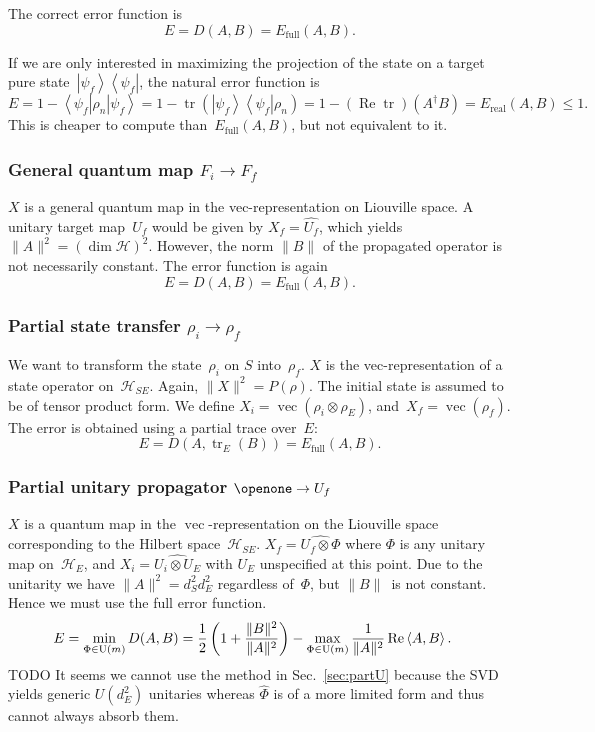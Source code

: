 \documentclass[aps, pra, a4paper, longbibliography, superscriptaddress]{revtex4-1}
\newcommand{\I}{\openone}
\newcommand{\be}{\begin{equation}}
\newcommand{\ee}{\end{equation}}
\newcommand{\ket}[1]{\left| #1 \right \rangle}
\newcommand{\bra}[1]{\left \langle #1 \right|}
\newcommand{\ketbra}[2]{\left| #1 \right \rangle \left \langle #2 \right|}
\newcommand{\inprod}[2]{\left\langle #1, #2 \right\rangle}
\newcommand{\hilb}[1]{\mathcal{#1}}
\DeclareMathOperator{\tr}{tr}
\DeclareMathOperator{\re}{Re}
\DeclareMathOperator{\cvec}{vec}
\newcommand{\vecop}[1]{\widehat{#1}}
\begin{document}
The correct error function is
\be
E
= D(A, B)
= E_\text{full}(A, B).
\ee

If we are only interested in maximizing the projection of
the state on a target pure state~$\ketbra{\psi_f}{\psi_f}$, the natural error
function is
\be
E
= 1 -\bra{\psi_f} \rho_n \ket{\psi_f}
= 1 -\tr\left(\ketbra{\psi_f}{\psi_f} \rho_n \right)
= 1 -(\re \tr)\left(A^\dagger B\right)
= E_\text{real}(A, B) \le 1.
\ee
This is cheaper to compute than~$E_\text{full}(A, B)$, but not equivalent to it.


\subsubsection{General quantum map $F_i \to F_f$}

$X$ is a general quantum map in the vec-representation on Liouville space.
A unitary target map~$U_f$ would be given by
$X_f = \vecop{U_f}$, which yields $\|A\|^2 = (\dim \hilb{H})^2$.
However, the norm $\|B\|$ of the propagated operator
is not necessarily constant. The error function is again
\be
E
= D(A, B)
= E_\text{full}(A, B).
\ee


\subsubsection{Partial state transfer $\rho_i \to \rho_f$}

We want to transform the state~$\rho_i$ on $S$ into~$\rho_f$.
$X$ is the vec-representation of a state operator on~$\hilb{H}_{SE}$.
Again, $\|X\|^2 = P(\rho)$.
The initial state is assumed to be of tensor product form.
We define $X_i = \cvec(\rho_i \otimes \rho_E)$,
and~$X_f = \cvec(\rho_f)$.
The error is obtained using a partial trace over~$E$:
\be
E
= D(A, \tr_E(B))
= E_\text{full}(A, B).
\ee


\subsubsection{Partial unitary propagator $\I \to U_f$}

$X$ is a quantum map in the $\cvec$-representation on the Liouville
space corresponding to the Hilbert space~$\hilb{H}_{SE}$.
$X_f = \vecop{U_f \otimes \Phi}$
where $\Phi$ is any unitary map on~$\hilb{H}_E$, and
$X_i = \vecop{U_i \otimes U_E}$ with $U_E$ unspecified at this point.
Due to the unitarity we have $\|A\|^2 = d_S^2 d_E^2$ regardless of~$\Phi$,
but $\|B\|$~is not constant. Hence we must use the full error function.
\begin{align}
\notag
E
&= \min_{\Phi \in \text{U}(m)} D(A, B)
= \frac{1}{2}\left(1 +\frac{\|B\|^2}{\|A\|^2}\right)
-\max_{\Phi \in \text{U}(m)} \frac{1}{\|A\|^2} \re \inprod{A}{B}.
\end{align}
TODO It seems we cannot use the method in Sec.~\ref{sec:partU}
because the SVD yields generic $U(d_E^2)$ unitaries whereas $\vecop{\Phi}$
is of a more limited form and thus cannot always absorb them.
\end{document}
